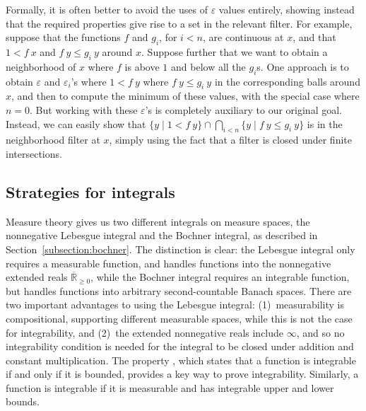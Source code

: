 \documentclass{svjour3}
\newcommand{\ennRR}{\overline{\mathbb{R}}_{\ge 0}}
\begin{document}
Formally, it is often better to avoid the uses of $\varepsilon$ values entirely, showing instead that the required properties give rise to a set in the relevant filter. For example, suppose that the functions $f$ and $g_i$, for $i < n$, are continuous at $x$, and that $1 < f~x$ and $f~y \le g_i~y$ around $x$. Suppose further that we want to obtain a neighborhood of $x$ where $f$ is above $1$ and below all the $g_i$s. One approach is to obtain $\varepsilon$ and $\varepsilon_i$'s where $1 < f~y$ where $f~y \le g_i~y$ in the corresponding balls around $x$, and then to compute the minimum of these values, with the special case where $n = 0$. But working with these $\varepsilon$'s is completely auxiliary to our original goal. Instead, we can easily show that $\{ y \mid 1 < f~y \} \cap \bigcap_{i < n} \{ y \mid f~y \le g_i~y \}$ is in the neighborhood filter at $x$, simply using the fact that a filter is closed under finite intersections.

\subsection{Strategies for integrals}

Measure theory gives us two different integrals on measure spaces, the nonnegative Lebesgue integral and the Bochner integral, as described in Section~\ref{subsection:bochner}. The distinction is clear: the Lebesgue integral only requires a measurable function, and handles functions into the nonnegative extended reals $\ennRR$, while the Bochner integral requires an integrable function, but handles functions into arbitrary second-countable Banach spaces. There are two important advantages to using the Lebesgue integral: (1)~measurability is compositional, supporting different measurable spaces, while this is not the case for integrability, and (2)~the extended nonnegative reals include $\infty$, and so no integrability condition is needed for the integral to be closed under addition and constant multiplication. The property , which states that a function is integrable if and only if it is bounded, provides a key way to prove integrability. Similarly, a function is integrable if it is measurable and has integrable upper and lower bounds.
\end{document}

